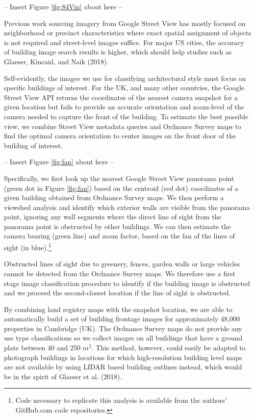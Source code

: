 \documentclass[]{article}
\let\rmarkdownfootnote\footnote%
\def\footnote{\protect\rmarkdownfootnote}
\begin{document}
\begin{center}
  -- Insert Figure \ref{fig:84Vin} about here --
\end{center}

Previous work sourcing imagery from Google Street View has mostly
focused on neighborhood or precinct characteristics where exact spatial
assignment of objects is not required and street-level images suffice.
For major US cities, the accuracy of building image search results is
higher, which should help studies such as Glaeser, Kincaid, and Naik
(2018).

Self-evidently, the images we use for classifying architectural style
must focus on specific buildings of interest. For the UK, and many other
countries, the Google Street View API returns the coordinates of the
nearest camera snapshot for a given location but fails to provide an
accurate orientation and zoom-level of the camera needed to capture the
front of the building. To estimate the best possible view, we combine
Street View metadata queries and Ordnance Survey maps to find the
optimal camera orientation to center images on the front door of the
building of interest.

\begin{center}
  -- Insert Figure \ref{fig:fan} about here --
\end{center}

Specifically, we first look up the nearest Google Street View panorama
point (green dot in Figure \ref{fig:fan}) based on the centroid (red
dot) coordinates of a given building obtained from Ordnance Survey maps.
We then perform a viewshed analysis and identify which exterior walls
are visible from the panorama point, ignoring any wall segments where
the direct line of sight from the panorama point is obstructed by other
buildings. We can then estimate the camera bearing (green line) and zoom
factor, based on the fan of the lines of sight (in
blue).\footnote{Code necessary to replicate this analysis is available from the authors' GitHub.com code repositories.}

Obstructed lines of sight due to greenery, fences, garden walls or large
vehicles cannot be detected from the Ordnance Survey maps. We therefore
use a first stage image classification procedure to identify if the
building image is obstructed and we proceed the second-closest location
if the line of sight is obstructed.

By combining land registry maps with the snapshot location, we are able
to automatically build a set of building frontage images for
approximately 48,000 properties in Cambridge (UK). The Ordnance Survey
maps do not provide any use type classifications so we collect images on
all buildings that have a ground plate between 40 and 250 \(m^2\). This
method, however, could easily be adapted to photograph buildings in
locations for which high-resolution building level maps are not
available by using LIDAR based building outlines instead, which would be
in the spirit of Glaeser et al. (2018).
\end{document}
